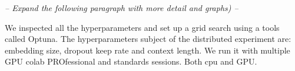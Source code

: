 \noindent \emph{-- Expand the following paragraph with more detail and graphs) --}

We inspected all the hyperparameters and set up a grid search using a tools called Optuna.
The hyperparameters subject of the distributed experiment are: embedding size, dropout keep rate and context length.
We run it with multiple GPU colab PROfessional and standards sessions. Both cpu and GPU. 

